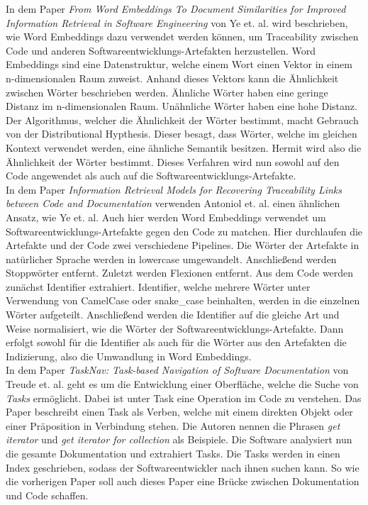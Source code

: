 In dem Paper \textit{From Word Embeddings To Document Similarities for Improved Information Retrieval in Software Engineering} von Ye et. al. wird beschrieben, wie Word Embeddings dazu verwendet werden können, um Traceability zwischen Code und anderen Softwareentwicklungs-Artefakten herzustellen.
Word Embeddings sind eine Datenstruktur, welche einem Wort einen Vektor in einem n-dimensionalen Raum zuweist.
Anhand dieses Vektors kann die Ähnlichkeit zwischen Wörter beschrieben werden.
Ähnliche Wörter haben eine geringe Distanz im n-dimensionalen Raum.
Unähnliche Wörter haben eine hohe Distanz.
Der Algorithmus, welcher die Ähnlichkeit der Wörter bestimmt, macht Gebrauch von der Distributional Hypthesis.
Dieser besagt, dass Wörter, welche im gleichen Kontext verwendet werden, eine ähnliche Semantik besitzen.
Hermit wird also die Ähnlichkeit der Wörter bestimmt.
Dieses Verfahren wird nun sowohl auf den Code angewendet als auch auf die Softwareentwicklungs-Artefakte.\cite{Ye_Shen_Ma_Bunescu_Liu_2016}\\

In dem Paper \textit{Information Retrieval Models for Recovering Traceability Links between Code and Documentation} verwenden Antoniol et. al. einen ähnlichen Ansatz, wie Ye et. al.
Auch hier werden Word Embeddings verwendet um Softwareentwicklungs-Artefakte gegen den Code zu matchen.
Hier durchlaufen die Artefakte und der Code zwei verschiedene Pipelines.
Die Wörter der Artefakte in natürlicher Sprache werden in lowercase umgewandelt.
Anschließend werden Stoppwörter entfernt.
Zuletzt werden Flexionen entfernt.
Aus dem Code werden zunächst Identifier extrahiert.
Identifier, welche mehrere Wörter unter Verwendung von CamelCase oder snake\_case beinhalten, werden in die einzelnen Wörter aufgeteilt.
Anschließend werden die Identifier auf die gleiche Art und Weise normalisiert, wie die Wörter der Softwareentwicklungs-Artefakte.
Dann erfolgt sowohl für die Identifier als auch für die Wörter aus den Artefakten die Indizierung, also die Umwandlung in Word Embeddings.\cite{Antoniol_Canfora_Casazza_DeLucia_2000}\\

In dem Paper \textit{TaskNav: Task-based Navigation of Software Documentation} von Treude et. al. geht es um die Entwicklung einer Oberfläche, welche die Suche von \textit{Tasks} ermöglicht.
Dabei ist unter Task eine Operation im Code zu verstehen.
Das Paper beschreibt einen Task als Verben, welche mit einem direkten Objekt oder einer Präposition in Verbindung stehen.
Die Autoren nennen die Phrasen \textit{get iterator} und \textit{get iterator for collection} als Beispiele.
Die Software analysiert nun die gesamte Dokumentation und extrahiert Tasks.
Die Tasks werden in einen Index geschrieben, sodass der Softwareentwickler nach ihnen suchen kann. 
So wie die vorherigen Paper soll auch dieses Paper eine Brücke zwischen Dokumentation und Code schaffen.\cite{Treude_Sicard_Klocke_Robillard_2015}